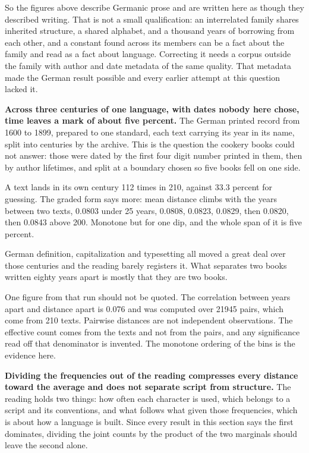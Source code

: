 So the figures above describe Germanic prose and are written here as though they described writing. That is not a small qualification: an interrelated family shares inherited structure, a shared alphabet, and a thousand years of borrowing from each other, and a constant found across its members can be a fact about the family and read as a fact about language. Correcting it needs a corpus outside the family with author and date metadata of the same quality. That metadata made the German result possible and every earlier attempt at this question lacked it.

\textbf{Across three centuries of one language, with dates nobody here chose, time leaves a mark of about five percent.} The German printed record from 1600 to 1899, prepared to one standard, each text carrying its year in its name, split into centuries by the archive. This is the question the cookery books could not answer: those were dated by the first four digit number printed in them, then by author lifetimes, and split at a boundary chosen so five books fell on one side.

A text lands in its own century 112 times in 210, against 33.3 percent for guessing. The graded form says more: mean distance climbs with the years between two texts, 0.0803 under 25 years, 0.0808, 0.0823, 0.0829, then 0.0820, then 0.0843 above 200. Monotone but for one dip, and the whole span of it is five percent.

German definition, capitalization and typesetting all moved a great deal over those centuries and the reading barely registers it. What separates two books written eighty years apart is mostly that they are two books.

One figure from that run should not be quoted. The correlation between years apart and distance apart is 0.076 and was computed over 21945 pairs, which come from 210 texts. Pairwise distances are not independent observations. The effective count comes from the texts and not from the pairs, and any significance read off that denominator is invented. The monotone ordering of the bins is the evidence here.

\textbf{Dividing the frequencies out of the reading compresses every distance toward the average and does not separate script from structure.} The reading holds two things: how often each character is used, which belongs to a script and its conventions, and what follows what given those frequencies, which is about how a language is built. Since every result in this section says the first dominates, dividing the joint counts by the product of the two marginals should leave the second alone.

